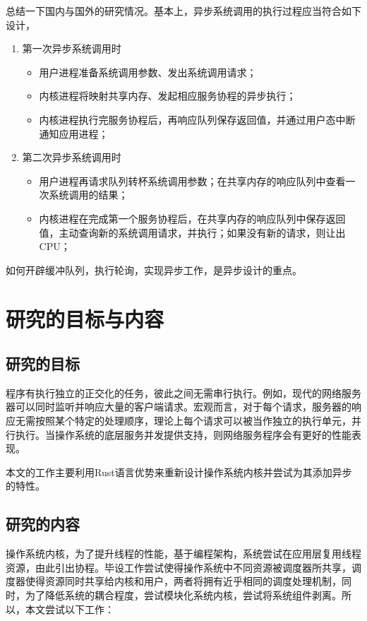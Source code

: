 总结一下国内与国外的研究情况。基本上，异步系统调用的执行过程应当符合如下设计，

\begin{enumerate}
    \item 第一次异步系统调用时
    \begin{itemize}
        \item 用户进程准备系统调用参数、发出系统调用请求；
        \item 内核进程将映射共享内存、发起相应服务协程的异步执行；
        \item 内核进程执行完服务协程后，再响应队列保存返回值，并通过用户态中断通知应用进程；
    \end{itemize}

    \item 第二次异步系统调用时
    \begin {itemize}
        \item 用户进程再请求队列转杯系统调用参数；在共享内存的响应队列中查看一次系统调用的结果；
        \item 内核进程在完成第一个服务协程后，在共享内存的响应队列中保存返回值，主动查询新的系统调用请求，并执行；如果没有新的请求，则让出CPU；
    \end{itemize}
\end{enumerate}

如何开辟缓冲队列，执行轮询，实现异步工作，是异步设计的重点。

\section{研究的目标与内容}

\subsection{研究的目标}

程序有执行独立的正交化的任务，彼此之间无需串行执行。例如，现代的网络服务器可以同时监听并响应大量的客户端请求。宏观而言，对于每个请求，服务器的响应无需按照某个特定的处理顺序，理论上每个请求可以被当作独立的执行单元，并行执行。当操作系统的底层服务并发提供支持，则网络服务程序会有更好的性能表现。

本文的工作主要利用Rust语言优势来重新设计操作系统内核并尝试为其添加异步的特性。

\subsection{研究的内容}

操作系统内核，为了提升线程的性能，基于编程架构，系统尝试在应用层复用线程资源，由此引出协程。毕设工作尝试使得操作系统中不同资源被调度器所共享，调度器使得资源同时共享给内核和用户，两者将拥有近乎相同的调度处理机制，同时，为了降低系统的耦合程度，尝试模块化系统内核，尝试将系统组件剥离。所以，本文尝试以下工作：

